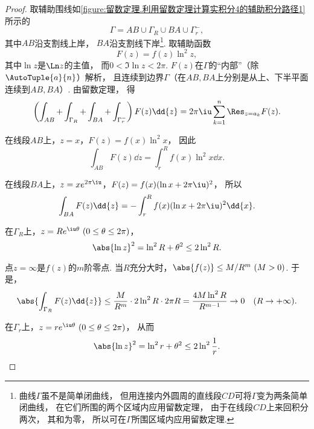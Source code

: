 \begin{theorem}
\begin{proof}
取辅助围线如\cref{figure:留数定理.利用留数定理计算实积分4的辅助积分路径1} 所示的\begin{equation*}
	\Gamma = AB \cup \Gamma_R \cup BA \cup \Gamma_r^-,
\end{equation*}
其中\(AB\)沿支割线上岸，
\(BA\)沿支割线下岸\footnote{曲线\(\Gamma\)虽不是简单闭曲线，
但用连接内外圆周的直线段\(CD\)可将\(\Gamma\)变为两条简单闭曲线，
在它们所围的两个区域内应用留数定理，
由于在线段\(CD\)上来回积分两次，
其和为零，
所以可在\(\Gamma\)所围区域内应用留数定理.}.
取辅助函数\begin{equation*}
	F(z) = f(z) \ln^2 z,
\end{equation*}
其中\(\ln z\)是\(\Ln z\)的主值，
而\(0<\Im\ln z<2\pi\).
\(F(z)\)在\(\Gamma\)的“内部”（除\(\AutoTuple{a}{n}\)）解析，
且连续到边界\(\Gamma\)（在\(AB,BA\)上分别是从上、下半平面连续到\(AB,BA\)）.
由留数定理，
得\begin{equation*}
	\left(\int_{AB}+\int_{\Gamma_R}+\int_{BA}+\int_{\Gamma_r^-}\right) F(z) \dd{z}
	= 2\pi\iu \sum_{k=1}^n \Res_{z=a_k} F(z).
\end{equation*}

在线段\(AB\)上，\(z=x\)，\(F(z) = f(x) \ln^2 x\)，
因此\begin{equation*}
	\int_{AB} F(z) \dd{z}
	= \int_r^R f(x) \ln^2 x \dd{x}.
\end{equation*}

在线段\(BA\)上，\(z = x e^{2\pi\iu}\)，\(F(z) = f(x) (\ln x + 2\pi\iu)^2\)，
所以\begin{equation*}
	\int_{BA} F(z) \dd{z}
	= -\int_r^R f(x) (\ln x + 2\pi\iu)^2 \dd{x}.
\end{equation*}

在\(\Gamma_R\)上，\(z = R e^{\iu\theta}\ (0\leq\theta\leq2\pi)\)，\begin{equation*}
	\abs{\ln z}^2 = \ln^2 R + \theta^2 \leq 2 \ln^2 R.
\end{equation*}

点\(z=\infty\)是\(f(z)\)的\(m\)阶零点.
当\(R\)充分大时，\(\abs{f(z)} \leq M/R^m\ (M>0)\).
于是，\begin{equation*}
	\abs{\int_{\Gamma_R} F(z) \dd{z}}
	\leq \frac{M}{R^m} \cdot 2 \ln^2 R \cdot 2\pi R
	= \frac{4M \ln^2 R}{R^{m-1}} \to 0 \quad(R\to+\infty).
\end{equation*}

在\(\Gamma_r\)上，\(z = r e^{\iu\theta}\ (0\leq\theta\leq2\pi)\)，
从而\begin{equation*}
	\abs{\ln z}^2 = \ln^2 r + \theta^2
	\leq 2 \ln^2 \frac{1}{r}.
\end{equation*}


\end{proof}
\end{theorem}
